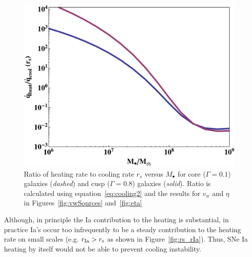 \documentclass[usenatbib,fleqn]{mn2e}
\newcommand{\rs}{r_s}
\newcommand{\Mbh}[1][]{M_{\bullet#1}}
\newcommand{\vwO}{v_{w}}
\begin{document}
\begin{figure}
\includegraphics[width=\columnwidth]{cooling2.pdf}
\caption{\label{fig:cooling2} Ratio of heating rate to cooling rate
  $\rs$ versus $\Mbh$ for core ($\Gamma=0.1$) galaxies ({\it dashed})
  and cusp ($\Gamma=0.8$) galaxies ({\it solid}). Ratio is calculated
  using equation~\eqref{eq:cooling2} and the results for $\vwO$ and
  $\eta$ in Figures~\ref{fig:vwSources} and~\ref{fig:eta}}
\end{figure}

Although, in principle the Ia contribution to the heating is
substantial, in practice Ia's occur too infrequently to be a steady
contribution to the heating rate on small scales (e.g. $r_{\rm Ia} >
r_{\rm s}$ as shown in Figure~\ref{fig:rs_rIa}). Thus, SNe Ia heating
by itself would not be able to prevent cooling instability.
\end{document}
